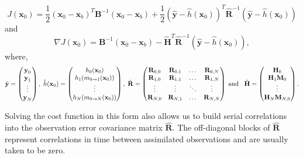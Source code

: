 \documentclass[11pt]{article}
\begin{document}
\begin{equation}
J(\textbf{x}_0) = \frac{1}{2}(\textbf{x}_0-\textbf{x}_b)^{T}\textbf{B}^{-1}(\textbf{x}_0-\textbf{x}_b)+\frac{1}{2}(\hat{\textbf{y}}-\hat{h}(\textbf{x}_0))^{T}\hat{\textbf{R}}^{-1}(\hat{\textbf{y}}-\hat{h}(\textbf{x}_0)) \label{costfn}
\end{equation}
and
\begin{equation}
\nabla J(\textbf{x}_0) = \textbf{B}^{-1}(\textbf{x}_0-\textbf{x}_b)-\hat{\mathbf{H}}^{T}\hat{\textbf{R}}^{-1}(\hat{\textbf{y}}-\hat{h}(\textbf{x}_0)), \label{gradcostfn}
\end{equation}
where,
\begin{equation}
\hat{\textbf{y}}=
\begin{pmatrix}
\textbf{y}_0 \\
\textbf{y}_1\\
\vdots \\
\textbf{y}_N
\end{pmatrix},
\hspace{1mm}
\hat{h}(\textbf{x}_0)=
\begin{pmatrix}
h_0(\textbf{x}_0) \\
h_1(m_{0\rightarrow 1}(\mathbf{x}_{0}))\\
\vdots \\
h_N(m_{0\rightarrow N}(\mathbf{x}_{0}))
\end{pmatrix},
\hspace{1mm}
\hat{\mathbf{R}}=
\begin{pmatrix}
\mathbf{R}_{0, 0} & \mathbf{R}_{0, 1} & \dots & \mathbf{R}_{0, N} \\
\mathbf{R}_{1, 0} & \mathbf{R}_{1, 1} & \dots & \mathbf{R}_{1, N} \\
\vdots & \vdots & \ddots & \vdots \\
\mathbf{R}_{N, 0} & \mathbf{R}_{N, 1} & \dots & \mathbf{R}_{N, N}
\end{pmatrix}
\hspace{1mm} \text{and} \hspace{3mm}
\hat{\mathbf{H}}=
\begin{pmatrix}
\mathbf{H}_0 \\
\mathbf{H}_1\mathbf{M}_0\\
\vdots \\
\mathbf{H}_N\mathbf{M}_{N,0}
\end{pmatrix}.
\end{equation}

Solving the cost function in this form also allows us to build serial correlations into the observation error covariance matrix $\hat{\mathbf{R}}$. The off-diagonal blocks of $\hat{\mathbf{R}}$ represent correlations in time between assimilated observations and are usually taken to be zero.
\end{document}
